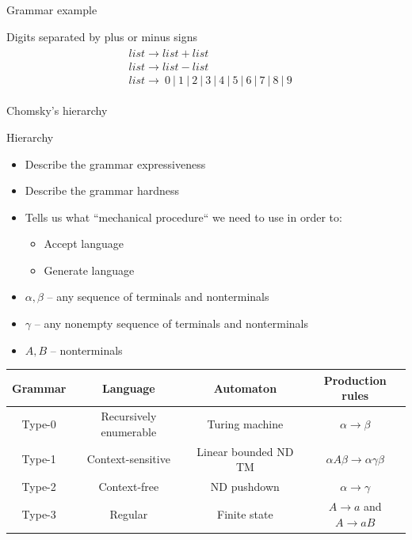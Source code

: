 \documentclass{beamer}
\begin{document}
\begin{frame}{Grammar example}
\begin{examples}{Digits separated by plus or minus signs}
\begin{eqnarray*}
\begin{aligned}
& list \rightarrow list + list \\
& list \rightarrow list - list \\
& list \rightarrow \ 0 \ | \ 1 \ | \ 2 \ | \ 3 \ | \ 4 \ | \ 5 \ | \ 6 \ | \ 7 \ | \ 8 \ | \ 9
\end{aligned}
\end{eqnarray*}
\end{examples}
\end{frame}

\begin{frame}{Chomsky's hierarchy}

\begin{block}{Hierarchy}
\begin{itemize}
\item Describe the grammar expressiveness
\item Describe the grammar hardness
\item Tells us what ``mechanical procedure`` we need to use in order to:
\begin{itemize}
\item Accept language
\item Generate language
\end{itemize}
\item $\alpha, \beta$ -- any sequence of terminals and nonterminals
\item $\gamma$ -- any nonempty sequence of terminals and nonterminals
\item $A, B$ -- nonterminals
\end{itemize}
\end{block}

\begin{table}\footnotesize
\begin{tabular}{c|c|c|c}
Grammar & Language & Automaton & Production rules \\
\hline
Type-0 & Recursively enumerable & Turing machine &  $\alpha \rightarrow \beta$ \\ %
Type-1 & Context-sensitive & Linear bounded ND TM &$\alpha A\beta \rightarrow \alpha \gamma \beta$ \\ 
Type-2 & Context-free & ND pushdown & $\alpha \rightarrow \gamma$ \\ 
Type-3 & Regular & Finite state &$A\rightarrow a$ and $A\rightarrow aB$ 
\end{tabular}
\end{table}


\end{frame}
\end{document}

